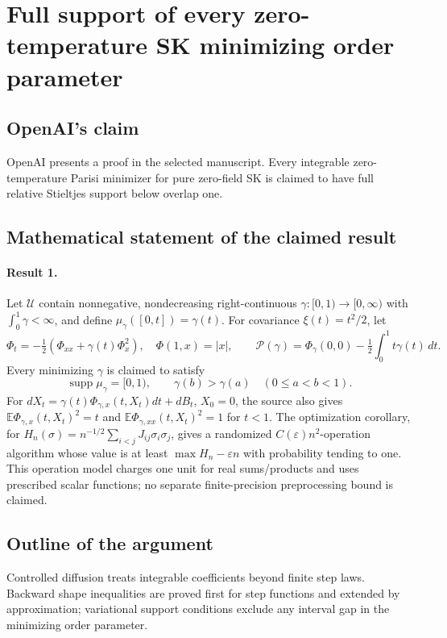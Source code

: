 \documentclass[11pt]{article}
\begin{document}
\section*{Full support of every zero-temperature SK minimizing order parameter}

\subsection{OpenAI's claim}
OpenAI presents a proof in the selected manuscript. Every integrable zero-temperature Parisi minimizer for pure zero-field SK is claimed to have full relative Stieltjes support below overlap one.

\subsection{Mathematical statement of the claimed result}
\paragraph{Result 1.} Let \(\mathcal U\) contain nonnegative, nondecreasing right-continuous \(\gamma:[0,1)\to[0,\infty)\) with \(\int_0^1\gamma<\infty\), and define \(\mu_\gamma([0,t])=\gamma(t)\). For covariance \(\xi(t)=t^2/2\), let
\[
 \Phi_t=-\tfrac12(\Phi_{xx}+\gamma(t)\Phi_x^2),\quad\Phi(1,x)=|x|,
 \qquad\mathcal P(\gamma)=\Phi_\gamma(0,0)-\tfrac12\int_0^1t\gamma(t)\,dt.
\]
Every minimizing \(\gamma\) is claimed to satisfy
\[
 \operatorname{supp}\mu_\gamma=[0,1),\qquad
 \gamma(b)>\gamma(a)\quad(0\le a<b<1).
\]
For \(dX_t=\gamma(t)\Phi_{\gamma,x}(t,X_t)dt+dB_t\), \(X_0=0\), the source also gives \(\mathbb E\Phi_{\gamma,x}(t,X_t)^2=t\) and \(\mathbb E\Phi_{\gamma,xx}(t,X_t)^2=1\) for \(t<1\). The optimization corollary, for \(H_n(\sigma)=n^{-1/2}\sum_{i<j}J_{ij}\sigma_i\sigma_j\), gives a randomized \(C(\varepsilon)n^2\)-operation algorithm whose value is at least \(\max H_n-\varepsilon n\) with probability tending to one. This operation model charges one unit for real sums/products and uses prescribed scalar functions; no separate finite-precision preprocessing bound is claimed.

\subsection{Outline of the argument}
Controlled diffusion treats integrable coefficients beyond finite step laws. Backward shape inequalities are proved first for step functions and extended by approximation; variational support conditions exclude any interval gap in the minimizing order parameter.
\end{document}
